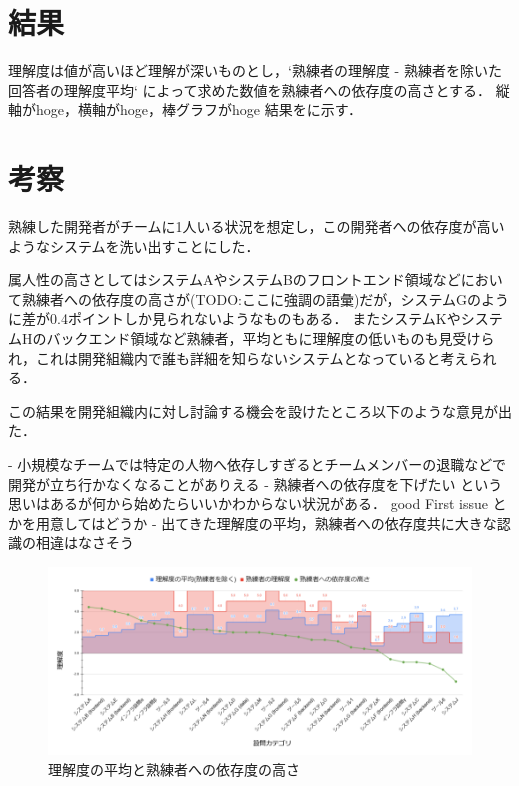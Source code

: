 \section{結果}

理解度は値が高いほど理解が深いものとし，`熟練者の理解度 - 熟練者を除いた回答者の理解度平均` によって求めた数値を熟練者への依存度の高さとする．
縦軸がhoge，横軸がhoge，棒グラフがhoge
結果をに示す．

\section{考察}

熟練した開発者がチームに1人いる状況を想定し，この開発者への依存度が高いようなシステムを洗い出すことにした．



属人性の高さとしてはシステムAやシステムBのフロントエンド領域などにおいて熟練者への依存度の高さが(TODO:ここに強調の語彙)だが，システムGのように差が0.4ポイントしか見られないようなものもある．
またシステムKやシステムHのバックエンド領域など熟練者，平均ともに理解度の低いものも見受けられ，これは開発組織内で誰も詳細を知らないシステムとなっていると考えられる．

この結果を開発組織内に対し討論する機会を設けたところ以下のような意見が出た．

- 小規模なチームでは特定の人物へ依存しすぎるとチームメンバーの退職などで開発が立ち行かなくなることがありえる
- 熟練者への依存度を下げたい という思いはあるが何から始めたらいいかわからない状況がある． good First issue とかを用意してはどうか
- 出てきた理解度の平均，熟練者への依存度共に大きな認識の相違はなさそう


\begin{figure}[t]
	\centering
	\includegraphics[keepaspectratio,width=0.9\linewidth]{img/rikai.png}
	\caption{理解度の平均と熟練者への依存度の高さ}
	\label{img:rikai}
\end{figure}
